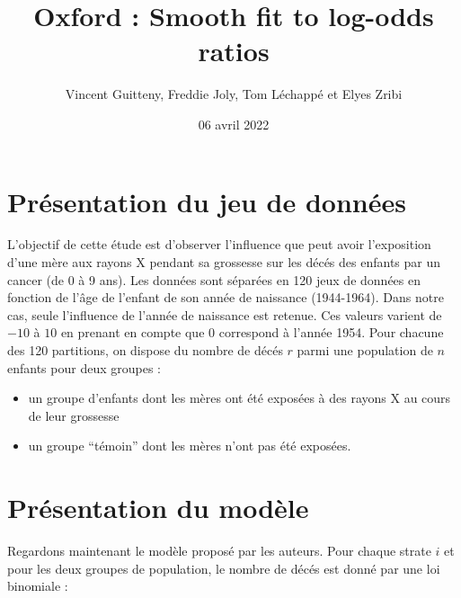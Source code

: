 \documentclass[
]{article}
\title{Oxford : Smooth fit to log-odds ratios}
\author{Vincent Guitteny, Freddie Joly, Tom Léchappé et Elyes Zribi}
\date{06 avril 2022}
\providecommand{\tightlist}{%
  \setlength{\itemsep}{0pt}\setlength{\parskip}{0pt}}
\begin{document}
\maketitle

\newenvironment{cols}[1][]{}{}
\newenvironment{col}[1]{\begin{minipage}{#1}\ignorespaces}{%
\end{minipage}
\ifhmode\unskip\fi
\aftergroup\useignorespacesandallpars}
\def\useignorespacesandallpars#1\ignorespaces\fi{%
#1\fi\ignorespacesandallpars}
\makeatletter
\def\ignorespacesandallpars{%
  \@ifnextchar\par
    {\expandafter\ignorespacesandallpars\@gobble}%
    {}%
}
\makeatother

\renewcommand\contentsname{Table des matières}
\newpage
\tableofcontents
\newpage

\hypertarget{pruxe9sentation-du-jeu-de-donnuxe9es}{%
\section{Présentation du jeu de
données}\label{pruxe9sentation-du-jeu-de-donnuxe9es}}

L'objectif de cette étude est d'observer l'influence que peut avoir
l'exposition d'une mère aux rayons X pendant sa grossesse sur les décés
des enfants par un cancer (de 0 à 9 ans). Les données sont séparées en
120 jeux de données en fonction de l'âge de l'enfant de son année de
naissance (1944-1964). Dans notre cas, seule l'influence de l'année de
naissance est retenue. Ces valeurs varient de \(-10\) à \(10\) en
prenant en compte que \(0\) correspond à l'année 1954. Pour chacune des
120 partitions, on dispose du nombre de décés \(r\) parmi une population
de \(n\) enfants pour deux groupes :

\begin{itemize}
\tightlist
\item
  un groupe d'enfants dont les mères ont été exposées à des rayons X au
  cours de leur grossesse
\item
  un groupe ``témoin'' dont les mères n'ont pas été exposées.
\end{itemize}

\hypertarget{pruxe9sentation-du-moduxe8le}{%
\section{Présentation du modèle}\label{pruxe9sentation-du-moduxe8le}}

Regardons maintenant le modèle proposé par les auteurs. Pour chaque
strate \(i\) et pour les deux groupes de population, le nombre de décés
est donné par une loi binomiale :
\end{document}
